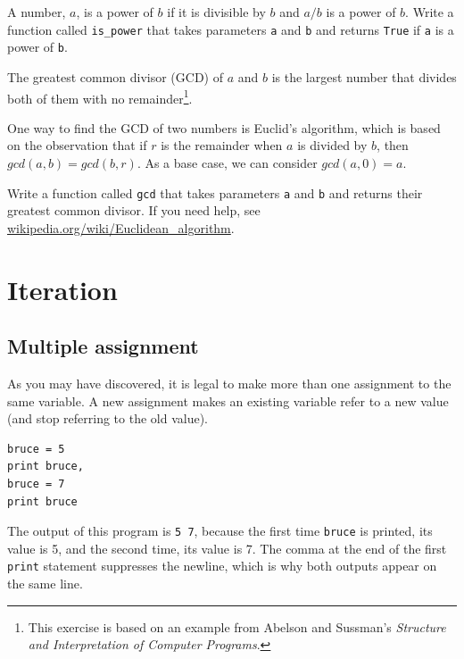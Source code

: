 \documentclass[10pt]{book}
\begin{document}
\begin{ex}
A number, $a$, is a power of $b$ if it is divisible by $b$
and $a/b$ is a power of $b$.  Write a function called
\verb"is_power" that takes parameters {\tt a} and {\tt b}
and returns {\tt True} if {\tt a} is a power of {\tt b}.
\end{ex}


\begin{ex}


The greatest common divisor (GCD) of $a$ and $b$ is the largest number
that divides both of them with no remainder\footnote{This exercise is
  based on an example from Abelson and Sussman's {\em Structure and
    Interpretation of Computer Programs}.}.

One way to find the GCD of two numbers is Euclid's algorithm,
which is based on the observation that if $r$ is the remainder
when $a$ is divided by $b$, then $gcd(a, b) = gcd(b, r)$.
As a base case, we can consider $gcd(a, 0) = a$.


Write a function called
\verb"gcd" that takes parameters {\tt a} and {\tt b}
and returns their greatest common divisor.  If you need
help, see \url{wikipedia.org/wiki/Euclidean_algorithm}.

\end{ex}


\chapter{Iteration}


\section{Multiple assignment}


As you may have discovered, it is legal to
make more than one assignment to the same variable.  A
new assignment makes an existing variable refer to a new
value (and stop referring to the old value).

\beforeverb
\begin{verbatim}
bruce = 5
print bruce,
bruce = 7
print bruce
\end{verbatim}
\afterverb
%
The output of this program is {\tt 5 7}, because the first time
{\tt bruce} is printed, its value is 5, and the second time, its
value is 7.  The
comma at the end of the first {\tt print} statement suppresses
the newline, which is why both outputs
appear on the same line.
\end{document}
